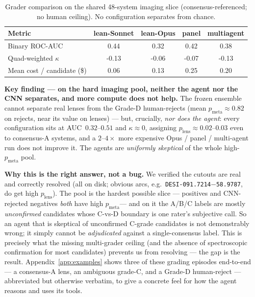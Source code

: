 \documentclass[11pt,letterpaper]{article}
\newcommand{\plens}{\ensuremath{p_{\mathrm{lens}}}}
\newcommand{\pmeta}{\ensuremath{p_{\mathrm{meta}}}}
\newcommand{\leansAUC}{0.44}\newcommand{\leansQWK}{-0.13}\newcommand{\leansCost}{0.06}
\newcommand{\leanoAUC}{0.32}\newcommand{\leanoQWK}{-0.06}\newcommand{\leanoCost}{0.13}
\newcommand{\panelAUC}{0.42}\newcommand{\panelQWK}{-0.07}\newcommand{\panelCost}{0.25}
\newcommand{\maAUC}{0.38}\newcommand{\maQWK}{-0.13}\newcommand{\maCost}{0.20}
\newcommand{\cnnDpmeta}{0.82}        %
\begin{document}
\begin{table}[h]\centering
\caption{Grader comparison on the shared 48-system imaging slice (consensus-referenced;
no human ceiling). No configuration separates from chance.}
\label{tab:modes}
\begin{tabular}{lcccc}
\hline
Metric & lean-Sonnet & lean-Opus & panel & multiagent \\
\hline
Binary ROC-AUC            & \leansAUC  & \leanoAUC & \panelAUC & \maAUC \\
Quad-weighted $\kappa$    & \leansQWK  & \leanoQWK & \panelQWK & \maQWK \\
Mean cost / candidate (\$)& \leansCost & \leanoCost& \panelCost& \maCost \\
\hline
\end{tabular}
\end{table}

\textbf{Key finding --- on the hard imaging pool, neither the agent nor the CNN separates,
and more compute does not help.} The frozen ensemble cannot separate real lenses from the
Grade-D human-rejects (mean \pmeta{}$\approx\cnnDpmeta$ on rejects, near its value on
lenses) --- but, crucially, \emph{nor does the agent}: every configuration sits at
AUC~$0.32$--$0.51$ and $\kappa\!\approx\!0$, assigning $\plens\!\approx\!0.02$--$0.03$ even
to consensus-A systems, and a $2$--$4\times$ more expensive Opus / panel / multi-agent run
does not improve it. The agents are \emph{uniformly skeptical} of the whole high-\pmeta{}
pool.

\textbf{Why this is the right answer, not a bug.} We verified the cutouts are real and
correctly resolved (all on disk; obvious arcs, e.g.\ \texttt{DESI-091.7214$-$58.9787}, do
get high \plens). The pool is the hardest possible slice --- positives and CNN-rejected
negatives \emph{both} have high \pmeta --- and on it the A/B/C labels are mostly
\emph{unconfirmed} candidates whose C-vs-D boundary is one rater's subjective call. So an
agent that is skeptical of unconfirmed C-grade candidates is not demonstrably wrong; it
simply cannot be \emph{adjudicated} against a single-consensus label. This is precisely
what the missing multi-grader ceiling (and the absence of spectroscopic confirmation for
most candidates) prevents us from resolving --- the gap is the result.
Appendix~\ref{app:examples} shows three of these grading episodes end-to-end --- a
consensus-A lens, an ambiguous grade-C, and a Grade-D human-reject --- abbreviated but
otherwise verbatim, to give a concrete feel for how the agent reasons and uses its tools.
\end{document}
